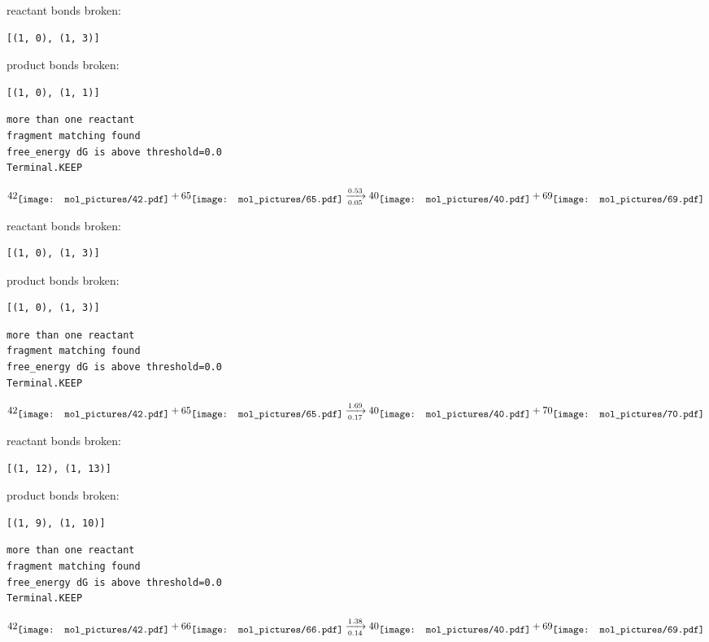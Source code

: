\documentclass{article}
\begin{document}
reactant bonds broken:\begin{verbatim}
[(1, 0), (1, 3)]
\end{verbatim}
product bonds broken:\begin{verbatim}
[(1, 0), (1, 1)]
\end{verbatim}




\vspace{1cm}
\begin{verbatim}
more than one reactant
fragment matching found
free_energy dG is above threshold=0.0
Terminal.KEEP
\end{verbatim}
$$
42
\raisebox{-.5\height}{\texttt{[image: mol\_pictures/42.pdf]}}
+
65
\raisebox{-.5\height}{\texttt{[image: mol\_pictures/65.pdf]}}
\xrightarrow[0.05]{0.53}
40
\raisebox{-.5\height}{\texttt{[image: mol\_pictures/40.pdf]}}
+
69
\raisebox{-.5\height}{\texttt{[image: mol\_pictures/69.pdf]}}
$$


reactant bonds broken:\begin{verbatim}
[(1, 0), (1, 3)]
\end{verbatim}
product bonds broken:\begin{verbatim}
[(1, 0), (1, 3)]
\end{verbatim}




\vspace{1cm}
\begin{verbatim}
more than one reactant
fragment matching found
free_energy dG is above threshold=0.0
Terminal.KEEP
\end{verbatim}
$$
42
\raisebox{-.5\height}{\texttt{[image: mol\_pictures/42.pdf]}}
+
65
\raisebox{-.5\height}{\texttt{[image: mol\_pictures/65.pdf]}}
\xrightarrow[0.17]{1.69}
40
\raisebox{-.5\height}{\texttt{[image: mol\_pictures/40.pdf]}}
+
70
\raisebox{-.5\height}{\texttt{[image: mol\_pictures/70.pdf]}}
$$


reactant bonds broken:\begin{verbatim}
[(1, 12), (1, 13)]
\end{verbatim}
product bonds broken:\begin{verbatim}
[(1, 9), (1, 10)]
\end{verbatim}




\vspace{1cm}
\begin{verbatim}
more than one reactant
fragment matching found
free_energy dG is above threshold=0.0
Terminal.KEEP
\end{verbatim}
$$
42
\raisebox{-.5\height}{\texttt{[image: mol\_pictures/42.pdf]}}
+
66
\raisebox{-.5\height}{\texttt{[image: mol\_pictures/66.pdf]}}
\xrightarrow[0.14]{1.38}
40
\raisebox{-.5\height}{\texttt{[image: mol\_pictures/40.pdf]}}
+
69
\raisebox{-.5\height}{\texttt{[image: mol\_pictures/69.pdf]}}
$$
\end{document}
